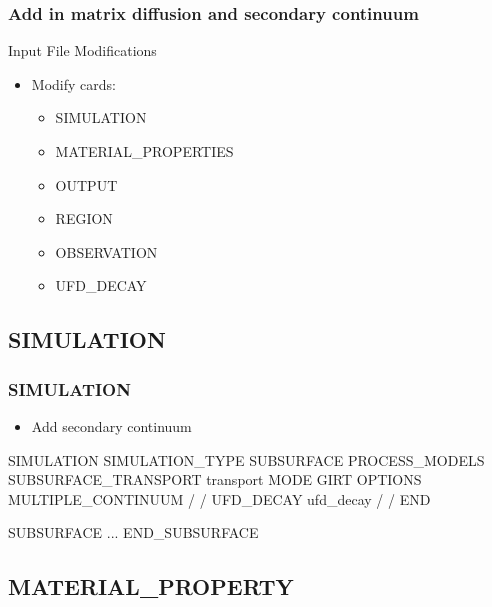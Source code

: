 \documentclass{beamer}
\newcommand\magentacomment[1]{{{\color{magenta} #1}}}
\begin{document}
\begin{frame}[fragile]\frametitle{Add in matrix diffusion and secondary continuum}

Input File Modifications
\begin{itemize}
\item Modify cards:
  \begin{itemize}
    \item SIMULATION
    \item MATERIAL\_PROPERTIES
    \item OUTPUT
    \item REGION
    \item OBSERVATION
    \item UFD\_DECAY
   \end{itemize}
\end{itemize}

\end{frame}

\subsection{SIMULATION}

\begin{frame}\frametitle{SIMULATION}
	
	\begin{itemize}
		\item Add secondary continuum
	\end{itemize}
	
\begin{semiverbatim}
SIMULATION
  SIMULATION_TYPE SUBSURFACE
  PROCESS_MODELS
    SUBSURFACE_TRANSPORT transport
      MODE GIRT
      \magentacomment{OPTIONS
         MULTIPLE_CONTINUUM
       /}
    /
    UFD_DECAY ufd_decay
    /
  /
END
		
SUBSURFACE
...
END_SUBSURFACE
\end{semiverbatim}
	
\end{frame}

\subsection{MATERIAL\_PROPERTY}
\end{document}
